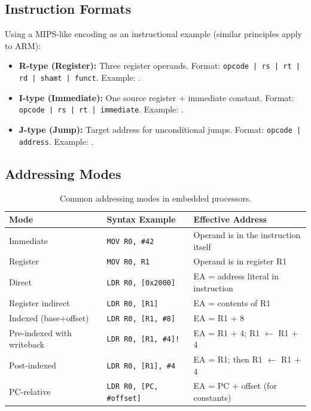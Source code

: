 \subsection{Instruction Formats}

Using a MIPS-like encoding as an instructional example (similar principles apply to ARM):

\begin{itemize}
  \item \textbf{R-type (Register):} Three register operands. Format: \texttt{opcode | rs | rt | rd | shamt | funct}. Example: .
  \item \textbf{I-type (Immediate):} One source register + immediate constant. Format: \texttt{opcode | rs | rt | immediate}. Example: .
  \item \textbf{J-type (Jump):} Target address for unconditional jumps. Format: \texttt{opcode | address}. Example: .
\end{itemize}

\subsection{Addressing Modes}

\begin{table}[H]
\centering
\caption{Common addressing modes in embedded processors.}
\label{tab:arch:addrmodes}
\begin{tabularx}{\textwidth}{l l X}
\toprule
\textbf{Mode} & \textbf{Syntax Example} & \textbf{Effective Address} \\
\midrule
Immediate & \texttt{MOV R0, \#42} & Operand is in the instruction itself \\
Register & \texttt{MOV R0, R1} & Operand is in register R1 \\
Direct & \texttt{LDR R0, [0x2000]} & EA = address literal in instruction \\
Register indirect & \texttt{LDR R0, [R1]} & EA = contents of R1 \\
Indexed (base+offset) & \texttt{LDR R0, [R1, \#8]} & EA = R1 + 8 \\
Pre-indexed with writeback & \texttt{LDR R0, [R1, \#4]!} & EA = R1 + 4; R1 $\leftarrow$ R1 + 4 \\
Post-indexed & \texttt{LDR R0, [R1], \#4} & EA = R1; then R1 $\leftarrow$ R1 + 4 \\
PC-relative & \texttt{LDR R0, [PC, \#offset]} & EA = PC + offset (for constants) \\
\bottomrule
\end{tabularx}
\end{table}


